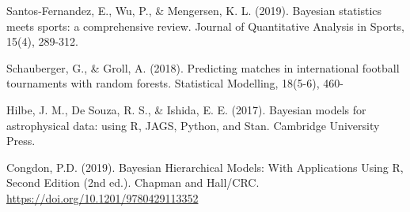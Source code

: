 \documentclass[
]{article}
\begin{document}
Santos-Fernandez, E., Wu, P., \& Mengersen, K. L. (2019). Bayesian
statistics meets sports: a comprehensive review. Journal of Quantitative
Analysis in Sports, 15(4), 289-312.

Schauberger, G., \& Groll, A. (2018). Predicting matches in
international football tournaments with random forests. Statistical
Modelling, 18(5-6), 460-

Hilbe, J. M., De Souza, R. S., \& Ishida, E. E. (2017). Bayesian models
for astrophysical data: using R, JAGS, Python, and Stan. Cambridge
University Press.

Congdon, P.D. (2019). Bayesian Hierarchical Models: With Applications
Using R, Second Edition (2nd ed.). Chapman and Hall/CRC.
\url{https://doi.org/10.1201/9780429113352}
\end{document}
